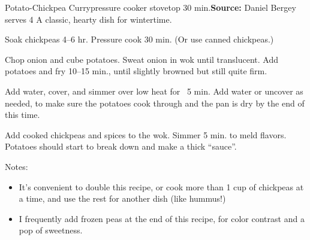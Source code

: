 \begin{recipe}{Potato-Chickpea Curry}{pressure cooker \hfill stovetop \hfill 30 min.}{\textbf{Source:} Daniel Bergey \hfill serves 4}
  \freeform A classic, hearty dish for wintertime.

Soak chickpeas 4--6 hr. Pressure cook 30 min. (Or use canned chickpeas.)

Chop onion and cube potatoes. Sweat onion in wok until translucent. Add potatoes and fry 10--15 min., until slightly browned but still quite firm.

Add water, cover, and simmer over low heat for ~5 min. Add water or uncover as needed, to make sure the potatoes cook through and the pan is dry by the end of this time.

Add cooked chickpeas and spices to the wok. Simmer 5 min. to meld flavors. Potatoes should start to break down and make a thick ``sauce''.

\freeform Notes:
\begin{itemize}
  \item It's convenient to double this recipe, or cook more than 1 cup of chickpeas at a time, and use the rest for another dish (like hummus!)
  \item I frequently add frozen peas at the end of this recipe, for color contrast and a pop of sweetness.
\end{itemize}
\end{recipe}